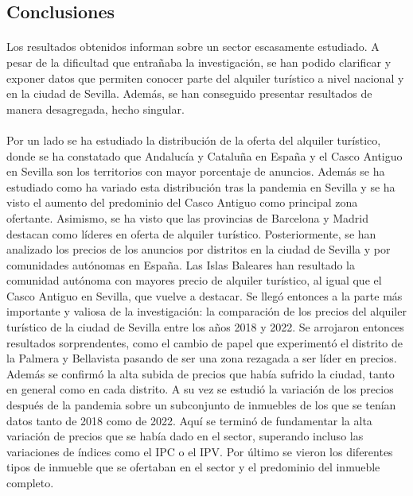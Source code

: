 \documentclass[a4paper,10pt]{article}
\begin{document}
    \setlength{\columnsep}{0.88cm}
    \begin{multicols}{2}

    \section{Conclusiones}

        \paragraph*{}
        Los resultados obtenidos informan sobre un sector escasamente estudiado. A pesar de la dificultad que entrañaba la investigación, se han podido
        clarificar y exponer datos que permiten conocer parte del alquiler turístico a nivel nacional y en la ciudad de Sevilla. Además, se han
        conseguido presentar resultados de manera desagregada, hecho singular. 
        
        \paragraph*{}
        Por un lado se ha estudiado la distribución de la oferta del alquiler 
        turístico, donde se ha constatado que Andalucía y Cataluña en España y el Casco Antiguo en Sevilla son los territorios con mayor porcentaje
        de anuncios. Además se ha estudiado como ha variado esta distribución tras la pandemia en Sevilla y se ha visto el aumento del predominio del 
        Casco Antiguo como principal zona ofertante. Asimismo, se ha visto que las provincias de Barcelona y Madrid destacan como líderes en oferta de alquiler turístico. Posteriormente, se han analizado los precios de los anuncios por distritos en la ciudad de Sevilla y por comunidades autónomas en España.
        Las Islas Baleares han resultado la comunidad autónoma con mayores precio de alquiler turístico, al igual que el Casco Antiguo en Sevilla, que 
        vuelve a destacar. Se llegó entonces a la parte más importante y valiosa de la investigación: la comparación de los precios del alquiler turístico
        de la ciudad de Sevilla entre los años 2018 y 2022. Se arrojaron entonces resultados sorprendentes, como el cambio de papel que experimentó el distrito 
        de la Palmera y Bellavista pasando de ser una zona rezagada a ser líder en precios. Además se confirmó la alta subida de precios que había sufrido la ciudad, tanto en general como en cada distrito. A su vez se estudió la variación de los precios después de la pandemia sobre un subconjunto de 
        inmuebles de los que se tenían datos tanto de 2018 como de 2022. Aquí se terminó de fundamentar la alta variación de precios que se había dado en el 
        sector, superando incluso las variaciones de índices como el IPC o el IPV. Por último se vieron los diferentes tipos de inmueble que se ofertaban
        en el sector y el predominio del inmueble completo. 


\end{multicols}
\end{document}
